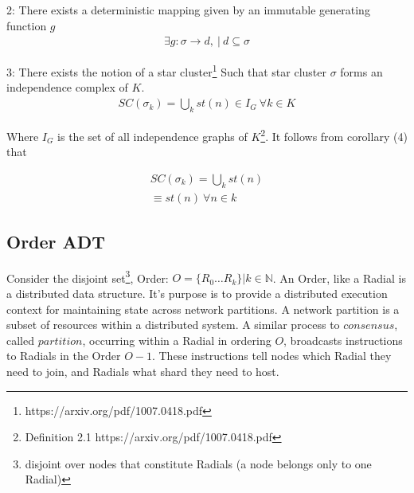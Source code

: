 \documentclass{article}
\begin{document}
2: There exists a deterministic mapping given by an immutable generating function $g$
\begin{equation} \label{eq1}
\begin{split}
\exists g: \sigma \rightarrow d, \ | \ d \subseteq \sigma
\end{split}
\end{equation}

3: There exists the notion of a star cluster\footnote{https://arxiv.org/pdf/1007.0418.pdf} Such that star cluster $\sigma$ forms an independence complex of $K$.
\begin{equation} \label{eq1}
\begin{split}
SC(\sigma_k) = \bigcup_k st(n) \in I_G \ \forall k \in K
\end{split}
\end{equation}

Where $I_G$ is the set of all independence graphs of $K$\footnote{Definition 2.1 https://arxiv.org/pdf/1007.0418.pdf}. It follows from corollary (4) that

\begin{equation} \label{eq1}
\begin{split}
SC(\sigma_k) = \bigcup_k st(n) \\
\equiv st(n) \ \forall n \in k
\end{split}
\end{equation}

\subsection{Order ADT}
Consider the disjoint set\footnote{disjoint over nodes that constitute Radials (a node belongs only to one Radial)}, Order: $O = \{R_0 \dots R_k \} | k \in \mathbb{N}$. An Order, like a Radial is a distributed data structure. It's purpose is to provide a distributed execution context for maintaining state across network partitions. A network partition is a subset of resources within a distributed system. A similar process to $consensus$, called $partition$, occurring within a Radial in ordering $O$, broadcasts instructions to Radials in the Order $O-1$. These instructions tell nodes which Radial they need to join, and Radials what shard they need to host.  
\end{document}
